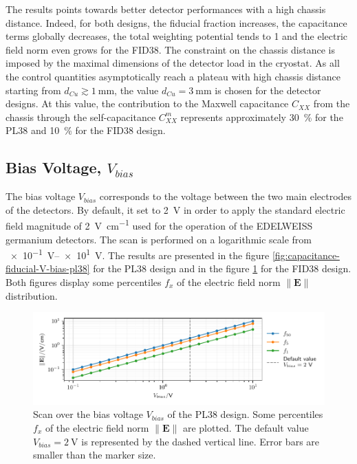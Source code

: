 The results points towards better detector performances with a high chassis distance. Indeed, for both designs, the fiducial fraction increases, the capacitance terms globally decreases, the total weighting potential tends to 1 and the electric field norm even grows for the FID38. The constraint on the chassis distance is imposed by the maximal dimensions of the detector load in the cryostat. As all the control quantities asymptotically reach a plateau with high chassis distance starting from $d_{Cu} \gtrsim \SI{1}{\mm}$, the value $d_{Cu} = \SI{3}{\mm}$ is chosen for the detector designs. At this value, the contribution to the Maxwell capacitance $C_{XX}$ from the chassis through the self-capacitance $C_{XX}^m$ represents approximately \SI{30}{\percent} for the PL38 and \SI{10}{\percent} for the FID38 design.



\subsection{Bias Voltage, $V_{bias}$}

The bias voltage $V_{bias}$ corresponds to the voltage between the two main electrodes of the detectors.
By default, it set to \SI{2}{\volt} in order to apply the standard electric field magnitude of \SI{2}{\volt\per\cm} used for the operation of the EDELWEISS germanium detectors. The scan is performed on a logarithmic scale from \SIrange{e-1}{e1}{\volt}. The results are presented in the figure \ref{fig:capacitance-fiducial-V-bias-pl38} for the PL38 design and in the figure \ref{fig:capacitance-fiducial-V-bias} for the FID38 design. Both figures display some percentiles $f_x$ of the electric field norm $\| \mathbf{E} \|$ distribution.

\begin{figure}
\centering
\includegraphics[scale=1]{Figures/ElectrodesScan/capacitance_fiducial_V_bias_pl38.pdf}
\caption{Scan over the bias voltage $V_{bias}$ of the PL38 design. Some percentiles $f_x$ of the electric field norm $\| \mathbf{E} \|$ are plotted. The default value $V_{bias}=\SI{2}{\volt}$ is represented by the dashed vertical line. Error bars are smaller than the marker size.}
\label{fig:capacitance-fiducial-V-bias}
\end{figure}


